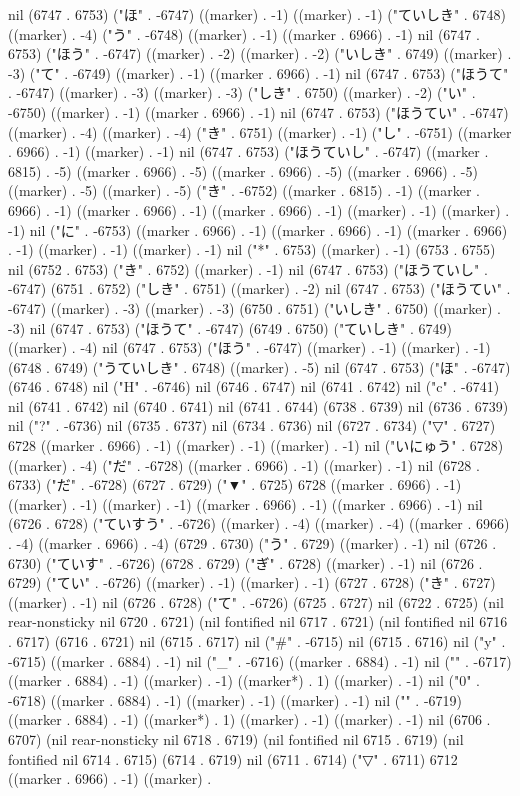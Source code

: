 {{nil (6747 . 6753) ("ほ" . -6747) ((marker) . -1) ((marker) . -1) ("ていしき" . 6748) ((marker) . -4) ("う" . -6748) ((marker) . -1) ((marker . 6966) . -1) nil (6747 . 6753) ("ほう" . -6747) ((marker) . -2) ((marker) . -2) ("いしき" . 6749) ((marker) . -3) ("て" . -6749) ((marker) . -1) ((marker . 6966) . -1) nil (6747 . 6753) ("ほうて" . -6747) ((marker) . -3) ((marker) . -3) ("しき" . 6750) ((marker) . -2) ("い" . -6750) ((marker) . -1) ((marker . 6966) . -1) nil (6747 . 6753) ("ほうてい" . -6747) ((marker) . -4) ((marker) . -4) ("き" . 6751) ((marker) . -1) ("し" . -6751) ((marker . 6966) . -1) ((marker) . -1) nil (6747 . 6753) ("ほうていし" . -6747) ((marker . 6815) . -5) ((marker . 6966) . -5) ((marker . 6966) . -5) ((marker . 6966) . -5) ((marker) . -5) ((marker) . -5) ("き" . -6752) ((marker . 6815) . -1) ((marker . 6966) . -1) ((marker . 6966) . -1) ((marker . 6966) . -1) ((marker) . -1) ((marker) . -1) nil ("に" . -6753) ((marker . 6966) . -1) ((marker . 6966) . -1) ((marker . 6966) . -1) ((marker) . -1) ((marker) . -1) nil ("*" . 6753) ((marker) . -1) (6753 . 6755) nil (6752 . 6753) ("き" . 6752) ((marker) . -1) nil (6747 . 6753) ("ほうていし" . -6747) (6751 . 6752) ("しき" . 6751) ((marker) . -2) nil (6747 . 6753) ("ほうてい" . -6747) ((marker) . -3) ((marker) . -3) (6750 . 6751) ("いしき" . 6750) ((marker) . -3) nil (6747 . 6753) ("ほうて" . -6747) (6749 . 6750) ("ていしき" . 6749) ((marker) . -4) nil (6747 . 6753) ("ほう" . -6747) ((marker) . -1) ((marker) . -1) (6748 . 6749) ("うていしき" . 6748) ((marker) . -5) nil (6747 . 6753) ("ほ" . -6747) (6746 . 6748) nil ("H" . -6746) nil (6746 . 6747) nil (6741 . 6742) nil ("c" . -6741) nil (6741 . 6742) nil (6740 . 6741) nil (6741 . 6744) (6738 . 6739) nil (6736 . 6739) nil ("?" . -6736) nil (6735 . 6737) nil (6734 . 6736) nil (6727 . 6734) ("▽" . 6727) 6728 ((marker . 6966) . -1) ((marker) . -1) ((marker) . -1) nil ("いにゅう" . 6728) ((marker) . -4) ("だ" . -6728) ((marker . 6966) . -1) ((marker) . -1) nil (6728 . 6733) ("だ" . -6728) (6727 . 6729) ("▼" . 6725) 6728 ((marker . 6966) . -1) ((marker) . -1) ((marker) . -1) ((marker . 6966) . -1) ((marker . 6966) . -1) nil (6726 . 6728) ("ていすう" . -6726) ((marker) . -4) ((marker) . -4) ((marker . 6966) . -4) ((marker . 6966) . -4) (6729 . 6730) ("う" . 6729) ((marker) . -1) nil (6726 . 6730) ("ていす" . -6726) (6728 . 6729) ("ぎ" . 6728) ((marker) . -1) nil (6726 . 6729) ("てい" . -6726) ((marker) . -1) ((marker) . -1) (6727 . 6728) ("き" . 6727) ((marker) . -1) nil (6726 . 6728) ("て" . -6726) (6725 . 6727) nil (6722 . 6725) (nil rear-nonsticky nil 6720 . 6721) (nil fontified nil 6717 . 6721) (nil fontified nil 6716 . 6717) (6716 . 6721) nil (6715 . 6717) nil ("#" . -6715) nil (6715 . 6716) nil ("y" . -6715) ((marker . 6884) . -1) nil ("_" . -6716) ((marker . 6884) . -1) nil ("{" . -6717) ((marker . 6884) . -1) ((marker) . -1) ((marker*) . 1) ((marker) . -1) nil ("0" . -6718) ((marker . 6884) . -1) ((marker) . -1) ((marker) . -1) nil ("}" . -6719) ((marker . 6884) . -1) ((marker*) . 1) ((marker) . -1) ((marker) . -1) nil (6706 . 6707) (nil rear-nonsticky nil 6718 . 6719) (nil fontified nil 6715 . 6719) (nil fontified nil 6714 . 6715) (6714 . 6719) nil (6711 . 6714) ("▽" . 6711) 6712 ((marker . 6966) . -1) ((marker) . }}
